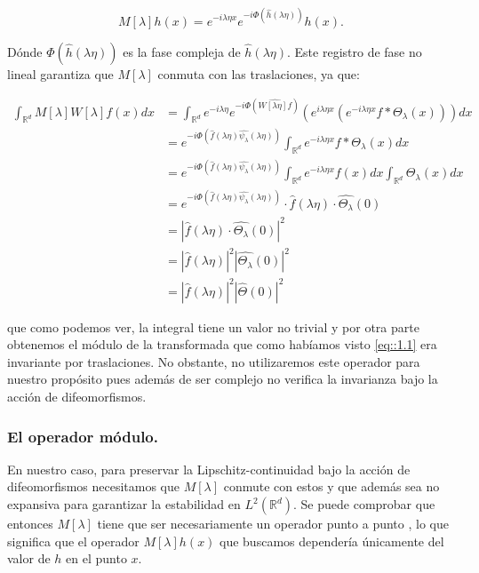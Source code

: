 \begin{equation}
  M[\lambda]h(x)=e^{-i\lambda\eta x} e^{-i \Phi(\widehat{h}(\lambda\eta))}h(x).
\end{equation}

\noindent Dónde $\Phi(\widehat{h}(\lambda\eta))$ es la fase compleja de $\widehat{h}(\lambda\eta)$. Este registro de fase no lineal garantiza que $M[\lambda]$ conmuta con las traslaciones, ya que: 


\begin{align*}
  \int_{\mathbb{R}^d} M[\lambda]W[\lambda] f(x) dx &= \int_{\mathbb{R}^d} e^{-i\lambda \eta} e^{-i \Phi (\widehat{W[\lambda\eta]f})} \left( e^{i\lambda\eta x} \left( e^{-i\lambda\eta x} f \ast \Theta_\lambda (x)\right)\right) dx \\
  &= e^{-i \Phi (\widehat{f}(\lambda\eta)\widehat{\psi_\lambda}(\lambda\eta))} \int_{\mathbb{R}^d} e^{-i\lambda\eta x} f \ast \Theta_\lambda (x) dx \\
  &=e^{-i \Phi (\widehat{f}(\lambda\eta)\widehat{\psi_\lambda}(\lambda\eta))} \int_{\mathbb{R}^d}e^{-i\lambda\eta x} f(x) dx  \int_{\mathbb{R}^d}\Theta_\lambda (x) dx  \\
  &=e^{-i \Phi (\widehat{f}(\lambda\eta)\widehat{\psi_\lambda}(\lambda\eta))} \cdot \widehat{f}(\lambda\eta) \cdot  \widehat{\Theta_\lambda}(0)\\
  &=\left| \widehat{f}(\lambda\eta) \cdot  \widehat{\Theta_\lambda}(0) \right|^2 \\
  &=\left| \widehat{f}(\lambda\eta)\right|^2 \left| \widehat{\Theta_\lambda}(0) \right|^2  \\
  &=\left| \widehat{f}(\lambda\eta)\right|^2 \left| \widehat{\Theta}(0) \right|^2 
\end{align*}

\noindent que como podemos ver, la integral tiene un valor no trivial y por otra parte obtenemos el módulo de la transformada que como habíamos visto \eqref{eq::1.1} era invariante por traslaciones. No obstante, no utilizaremos este operador para nuestro propósito pues además de ser complejo no verifica la invarianza bajo la acción de difeomorfismos.

\subsubsection{El operador módulo.}

\noindent En nuestro caso, para preservar la Lipschitz-continuidad bajo la acción de difeomorfismos necesitamos que $M[\lambda]$ conmute con estos y que además sea no expansiva para garantizar la estabilidad en $L^2(\mathbb{R}^d)$. Se puede comprobar que entonces $M[\lambda]$ tiene que ser necesariamente un operador punto a punto \cite{JBrunaOperatorsCommutingDiff}, lo que significa que el operador $M[\lambda]h(x)$ que buscamos dependería únicamente del valor de $h$ en el punto $x$.

